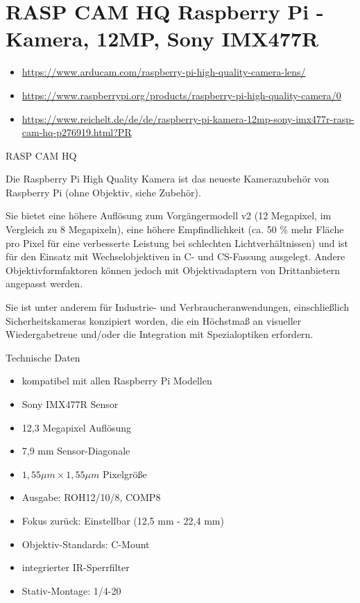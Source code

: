 %
%
%



\chapter{RASP CAM HQ Raspberry Pi - Kamera, 12MP, Sony IMX477R}

\begin{itemize}
  \item \url{https://www.arducam.com/raspberry-pi-high-quality-camera-lens/}
  \item \url{https://www.raspberrypi.org/products/raspberry-pi-high-quality-camera/0}
  \item \url{https://www.reichelt.de/de/de/raspberry-pi-kamera-12mp-sony-imx477r-rasp-cam-hq-p276919.html?PR}
\end{itemize}



RASP CAM HQ

Die Raspberry Pi High Quality Kamera ist das neueste Kamerazubehör von Raspberry Pi (ohne Objektiv, siehe Zubehör).


Sie bietet eine höhere Auflösung zum Vorgängermodell v2 (12 Megapixel, im Vergleich zu 8 Megapixeln), eine höhere Empfindlichkeit (ca. 50 \% mehr Fläche pro Pixel für eine verbesserte Leistung bei schlechten Lichtverhältnissen) und ist für den Einsatz mit Wechselobjektiven in C- und CS-Fassung ausgelegt. Andere Objektivformfaktoren können jedoch mit Objektivadaptern von Drittanbietern angepasst werden.

Sie ist unter anderem für Industrie- und Verbraucheranwendungen, einschließlich Sicherheitskameras konzipiert worden, die ein Höchstmaß an visueller Wiedergabetreue und/oder die Integration mit Spezialoptiken erfordern.

\bigskip

Technische Daten


\begin{itemize}
  \item kompatibel mit allen Raspberry Pi Modellen
  \item Sony IMX477R Sensor
  \item 12,3 Megapixel Auflösung
  \item 7,9 mm Sensor-Diagonale
  \item $1,55 \mu m \times  1,55 \mu m$ Pixelgröße
  \item Ausgabe: ROH12/10/8, COMP8
  \item Fokus zurück: Einstellbar (12,5 mm - 22,4 mm)
  \item Objektiv-Standards: C-Mount
  \item integrierter IR-Sperrfilter
  \item Stativ-Montage: 1/4\grqq{}-20
\end{itemize}


